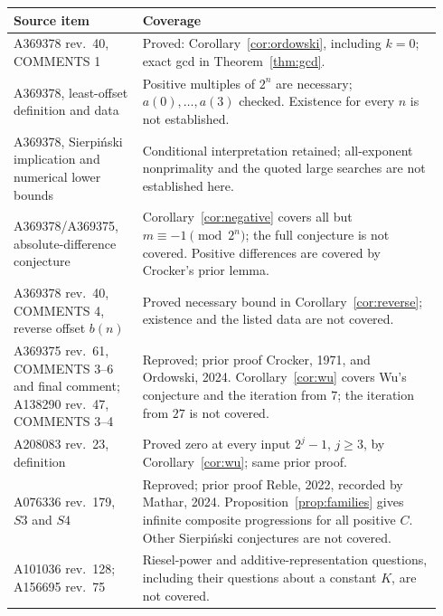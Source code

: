 \documentclass[11pt]{article}
\begin{document}
\noindent\begin{tabular}{@{}>{\raggedright\arraybackslash}p{0.29\linewidth}>{\raggedright\arraybackslash}p{0.65\linewidth}@{}}
\toprule
Source item & Coverage\\
\midrule
A369378 rev.~40, COMMENTS 1 & Proved: Corollary~\ref{cor:ordowski}, including $k=0$; exact gcd in Theorem~\ref{thm:gcd}.\\[3pt]
A369378, least-offset definition and data & Positive multiples of $2^n$ are necessary; $a(0),\ldots,a(3)$ checked. Existence for every $n$ is not established.\\[3pt]
A369378, Sierpi\'nski implication and numerical lower bounds & Conditional interpretation retained; all-exponent nonprimality and the quoted large searches are not established here.\\[3pt]
A369378/A369375, absolute-difference conjecture & Corollary~\ref{cor:negative} covers all but $m\equiv-1\pmod {2^n}$; the full conjecture is not covered. Positive differences are covered by Crocker's prior lemma.\\[3pt]
A369378 rev.~40, COMMENTS 4, reverse offset $b(n)$ & Proved necessary bound in Corollary~\ref{cor:reverse}; existence and the listed data are not covered.\\[3pt]
A369375 rev.~61, COMMENTS 3--6 and final comment; A138290 rev.~47, COMMENTS 3--4 & Reproved; prior proof Crocker, 1971, and Ordowski, 2024. Corollary~\ref{cor:wu} covers Wu's conjecture and the iteration from $7$; the iteration from $27$ is not covered.\\[3pt]
A208083 rev.~23, definition & Proved zero at every input $2^j-1$, $j\geq3$, by Corollary~\ref{cor:wu}; same prior proof.\\[3pt]
A076336 rev.~179, $S3$ and $S4$ & Reproved; prior proof Reble, 2022, recorded by Mathar, 2024. Proposition~\ref{prop:families} gives infinite composite progressions for all positive $C$. Other Sierpi\'nski conjectures are not covered.\\[3pt]
A101036 rev.~128; A156695 rev.~75 & Riesel-power and additive-representation questions, including their questions about a constant $K$, are not covered.\\
\bottomrule
\end{tabular}
\end{document}
